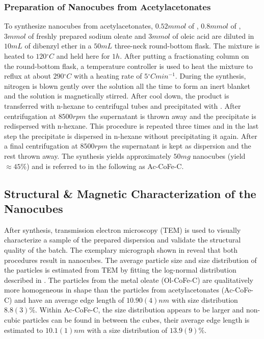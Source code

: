 \documentclass[\main/dresen_thesis.tex]{subfiles}
\begin{document}
    \subsubsection{Preparation of Nanocubes from Acetylacetonates}
      To synthesize nanocubes from acetylacetonates, $0.52 \unit{mmol}$ of , $0.8 \unit{mmol}$ of , $3 \unit{mmol}$ of freshly prepared sodium oleate and $3 \unit{mmol}$ of oleic acid are diluted in $10 \unit{mL}$ of dibenzyl ether in a $50 \unit{mL}$ three-neck round-bottom flask.
      The mixture is heated to $120 \unit{^\circ C}$ and held here for $1 \unit{h}$.
      After putting a fractionating column on the round-bottom flask, a temperature controller is used to heat the mixture to reflux at about $290 \unit{^\circ C}$ with a heating rate of $5 \unit{^\circ C min^{-1}}$.
      During the synthesis, nitrogen is blown gently over the solution all the time to form an inert blanket and the solution is magnetically stirred.
      After cool down, the product is transferred with n-hexane to centrifugal tubes and precipitated with .
      After centrifugation at $8500 \unit{rpm}$ the supernatant is thrown away and the precipitate is redispersed with n-hexane.
      This procedure is repeated three times and in the last step the precipitate is dispersed in n-hexane without precipitating it again.
      After a final centrifugation at $8500 \unit{rpm}$ the supernatant is kept as dispersion and the rest thrown away.
      The synthesis yields approximately $50 \unit{mg}$ nanocubes (yield $\approx 45 \%$) and is referred to in the following as Ac-CoFe-C.

  \subsection{Structural \& Magnetic Characterization of the Nanocubes}
  \label{sec:monolayers:nanoparticle:structuralCharacterization}
    After synthesis, transmission electron microscopy (TEM) is used to visually characterize a sample of the prepared dispersion and validate the structural quality of the batch.
    The exemplary micrograph shown in  reveal that both procedures result in nanocubes.
    The average particle size and size distribution of the particles is estimated from TEM by fitting the log-normal distribution described in .
    The particles from the metal oleate (Ol-CoFe-C) are qualitatively more homogeneous in shape than the particles from acetylacetonates (Ac-CoFe-C) and have an average edge length of $10.90(4) \unit{nm}$ with size distribution $8.8(3) \unit{\%}$.
    Within Ac-CoFe-C, the size distribution appears to be larger and non-cubic particles can be found in between the cubes, their average edge length is estimated to $10.1(1) \unit{nm}$ with a size distribution of $13.9(9) \unit{\%}$.
\end{document}
